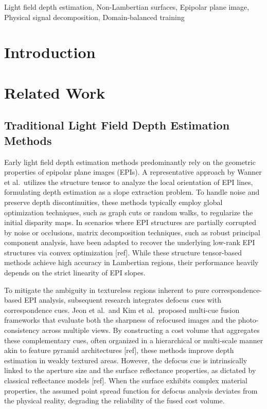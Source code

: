 \documentclass[lettersize,journal]{IEEEtran}
\begin{document}
\begin{IEEEkeywords}
Light field depth estimation, Non-Lambertian surfaces, Epipolar plane image, Physical signal decomposition, Domain-balanced training
\end{IEEEkeywords}

\section{Introduction}

\section{Related Work}

\subsection{Traditional Light Field Depth Estimation Methods}

Early light field depth estimation methods predominantly rely on the geometric properties of epipolar plane images (EPIs). A representative approach by Wanner et al.\ utilizes the structure tensor to analyze the local orientation of EPI lines, formulating depth estimation as a slope extraction problem. To handle noise and preserve depth discontinuities, these methods typically employ global optimization techniques, such as graph cuts or random walks, to regularize the initial disparity maps. In scenarios where EPI structures are partially corrupted by noise or occlusions, matrix decomposition techniques, such as robust principal component analysis, have been adapted to recover the underlying low-rank EPI structures via convex optimization [ref]. While these structure tensor-based methods achieve high accuracy in Lambertian regions, their performance heavily depends on the strict linearity of EPI slopes.

To mitigate the ambiguity in textureless regions inherent to pure correspondence-based EPI analysis, subsequent research integrates defocus cues with correspondence cues. Jeon et al.\ and Kim et al.\ proposed multi-cue fusion frameworks that evaluate both the sharpness of refocused images and the photo-consistency across multiple views. By constructing a cost volume that aggregates these complementary cues, often organized in a hierarchical or multi-scale manner akin to feature pyramid architectures [ref], these methods improve depth estimation in weakly textured areas. However, the defocus cue is intrinsically linked to the aperture size and the surface reflectance properties, as dictated by classical reflectance models [ref]. When the surface exhibits complex material properties, the assumed point spread function for defocus analysis deviates from the physical reality, degrading the reliability of the fused cost volume.
\end{document}
